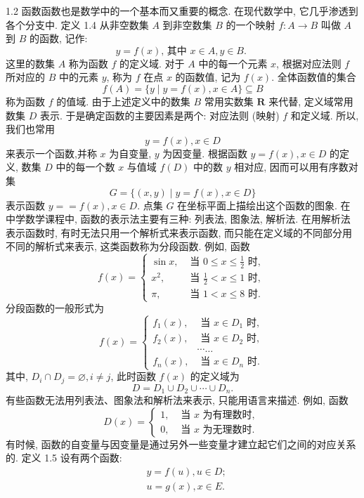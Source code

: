 1.2 函数函数也是数学中的一个基本而又重要的概念.
在现代数学中, 它几乎渗透到各个分支中.
定义 1.4 从非空数集 $A$ 到非空数集 $B$ 的一个映射 $f: A \rightarrow B$ 叫做 $A$ 到 $B$ 的函数, 记作:
$$
y=f(x) \text {, 其中 } x \in A, y \in B \text {. }
$$
这里的数集 $A$ 称为函数 $f$ 的定义域.
对于 $A$ 中的每一个元素 $x$, 根据对应法则 $f$ 所对应的 $B$ 中的元素 $y$, 称为 $f$ 在点 $x$ 的函数值, 记为 $f(x)$. 全体函数值的集合
$$
f(A)=\{y \mid y=f(x), x \in A\} \subseteq B
$$
称为函数 $f$ 的值域.
由于上述定义中的数集 $B$ 常用实数集 $\mathbf{R}$ 来代替, 定义域常用数集 $D$ 表示.
于是确定函数的主要因素是两个: 对应法则 (映射) $f$ 和定义域.
所以,我们也常用
$$
y=f(x), x \in D
$$
来表示一个函数,并称 $x$ 为自变量, $y$ 为因变量.
根据函数 $y=f(x), x \in D$ 的定义, 数集 $D$ 中的每一个数 $x$ 与值域 $f(D)$ 中的数 $y$ 相对应, 因而可以用有序数对集
$$
G=\{(x, y) \mid y=f(x), x \in D\}
$$
表示函数 $y==f(x), x \in D$.
点集 $G$ 在坐标平面上描绘出这个函数的图象.
在中学数学课程中, 函数的表示法主要有三种: 列表法, 图象法, 解析法.
在用解析法表示函数时, 有时无法只用一个解析式来表示函数, 而只能在定义域的不同部分用不同的解析式来表示, 这类函数称为分段函数.
例如, 函数
$$
f(x)= \begin{cases}\sin x, & \text { 当 } 0 \leqslant x \leqslant \frac{1}{2} \text { 时, } \\ x^2, & \text { 当 } \frac{1}{2}<x \leqslant 1 \text { 时, } \\ \pi, & \text { 当 } 1<x \leqslant 8 \text { 时.
}\end{cases}
$$
分段函数的一般形式为
$$
f(x)=\left\{\begin{array}{cc}
f_1(x), & \text { 当 } x \in D_1 \text { 时, } \\
f_2(x), & \text { 当 } x \in D_2 \text { 时, } \\
& \cdots \ldots \\
f_n(x), & \text { 当 } x \in D_n \text { 时.
}
\end{array}\right.
$$
其中, $D_i \cap D_j=\varnothing, i \neq j$, 此时函数 $f(x)$ 的定义域为
$$
D=D_1 \cup D_2 \cup \cdots \cup D_n .
$$
有些函数无法用列表法、图象法和解析法来表示, 只能用语言来描述.
例如, 函数
$$
D(x)= \begin{cases}1, & \text { 当 } x \text { 为有理数时, } \\ 0, & \text { 当 } x \text { 为无理数时.
}\end{cases}
$$
有时候, 函数的自变量与因变量是通过另外一些变量才建立起它们之间的对应关系的.
定义 1.5 设有两个函数:
$$
\begin{aligned}
& y=f(u), u \in D ; \\
& u=g(x), x \in E .
\end{aligned}
$$
